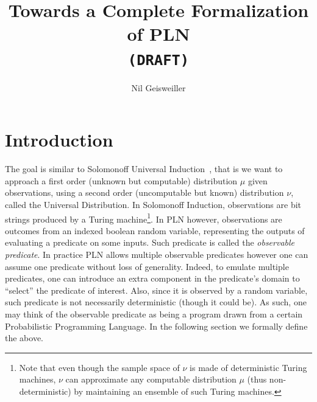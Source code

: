 \documentclass[]{article}
\begin{document}
\newcommand{\nuPLN}{\nu\textup{PLN}}
\newcommand{\Bool}{\textup{Bool}}
\newcommand{\True}{\texttt{True}}
\newcommand{\False}{\texttt{False}}
\newcommand{\Domain}{\mathcal{D}}
\newcommand{\Subdom}{\mathcal{S}}
\newcommand{\Predicate}{\mathcal{P}}
\newcommand{\Language}{\mathcal{L}}
\newcommand{\Bernoulli}{\mathcal{B}}
\newcommand{\Bernoullizx}{\Bernoulli[0,x]}
\newcommand{\Bernoullizo}{\Bernoulli[0,1]}
\newcommand{\Bernoullidt}{\Bernoulli_{d\theta}}
\newcommand{\Field}{\mathcal{F}}
\newcommand{\Model}{M}
\newcommand{\Data}{D}
\newcommand{\Datax}{\Data_{x}}
\newcommand{\DataxD}{\Data_{x\in\Domain}}
\newcommand{\DataS}{\Data_{\Subdom}}
\newcommand{\Datai}{\Data_{i}}
\newcommand{\STV}[2]{<\!#1, #2\!>}
\newcommand{\TV}[1]{\text{TV}(#1)}
\newcommand{\CDF}[1]{\text{CDF}_{#1}}
\newcommand{\limp}{\Rightarrow}
\newcommand{\Nat}{\mathbb{N}}
\newcommand{\anymu}{\hat{\mu}}
\newcommand{\anyomega}{\hat{\omega}}
\newcommand{\stirling}[1]{\sqrt{2\pi#1} \left(\frac{#1}{e}\right)^{#1}}
\newcommand{\stirnotpi}[1]{\sqrt{#1} \left(\frac{#1}{e}\right)^{#1}}
\newcommand{\stirpart}[1]{\left(\frac{#1}{e}\right)^{#1}}
\newcommand{\selfexp}[1]{#1^{#1}}
\newcommand{\sqstir}[1]{2\pi#1 \left(\frac{#1}{e}\right)^{2#1}}

\title{Towards a Complete Formalization of PLN\\
  \texttt{(DRAFT)}} \author{Nil Geisweiller}
\maketitle

\section{Introduction}
The goal is similar to Solomonoff Universal Induction~\cite{TODO},
that is we want to approach a first order (unknown but computable)
distribution $\mu$ given observations, using a second order
(uncomputable but known) distribution $\nu$, called the Universal
Distribution.  In Solomonoff Induction, observations are bit strings
produced by a Turing machine\footnote{Note that even though the sample
space of $\nu$ is made of deterministic Turing machines, $\nu$ can
approximate any computable distribution $\mu$ (thus non-deterministic)
by maintaining an ensemble of such Turing machines.}.  In PLN however,
observations are outcomes from an indexed boolean random variable,
representing the outputs of evaluating a predicate on some inputs.
Such predicate is called the \emph{observable predicate}.  In practice
PLN allows multiple observable predicates however one can assume one
predicate without loss of generality.  Indeed, to emulate multiple
predicates, one can introduce an extra component in the predicate's
domain to ``select'' the predicate of interest.  Also, since it is
observed by a random variable, such predicate is not necessarily
deterministic (though it could be).  As such, one may think of the
observable predicate as being a program drawn from a certain
Probabilistic Programming Language.  In the following section we
formally define the above.
\end{document}
